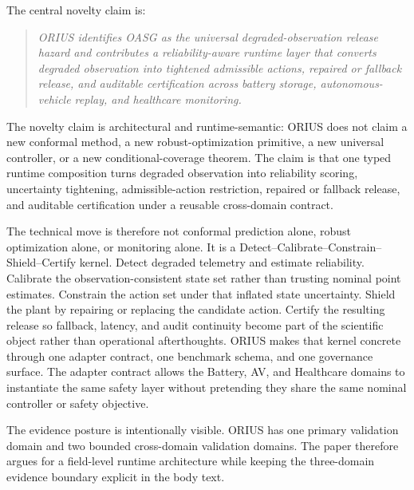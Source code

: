 The central novelty claim is:
\begin{quote}
\emph{ORIUS identifies OASG as the universal degraded-observation release hazard and
contributes a reliability-aware runtime layer that converts degraded observation into
tightened admissible actions, repaired or fallback release, and auditable certification
across battery storage, autonomous-vehicle replay, and healthcare monitoring.}
\end{quote}
The novelty claim is architectural and runtime-semantic: ORIUS does not claim a new
conformal method, a new robust-optimization primitive, a new universal controller, or a
new conditional-coverage theorem. The claim is that one typed runtime composition turns
degraded observation into reliability scoring, uncertainty tightening, admissible-action
restriction, repaired or fallback release, and auditable certification under a reusable
cross-domain contract.

The technical move is therefore not conformal prediction alone, robust optimization
alone, or monitoring alone. It is a Detect--Calibrate--Constrain--Shield--Certify kernel.
Detect
degraded telemetry and estimate reliability. Calibrate the observation-consistent state
set rather than trusting nominal point estimates. Constrain the action set under that
inflated state uncertainty. Shield the plant by repairing or replacing the candidate
action. Certify the resulting release so fallback, latency, and audit continuity become
part of the scientific object rather than operational afterthoughts. ORIUS makes that
kernel concrete through one adapter contract, one benchmark schema, and one governance
surface. The adapter contract allows the Battery, AV, and Healthcare domains to
instantiate the same safety layer without pretending they share the same nominal
controller or safety objective.

The evidence posture is intentionally visible. ORIUS has one primary validation domain
and two bounded cross-domain validation domains. The paper therefore argues for a
field-level runtime architecture while keeping the three-domain evidence boundary
explicit in the body text.

